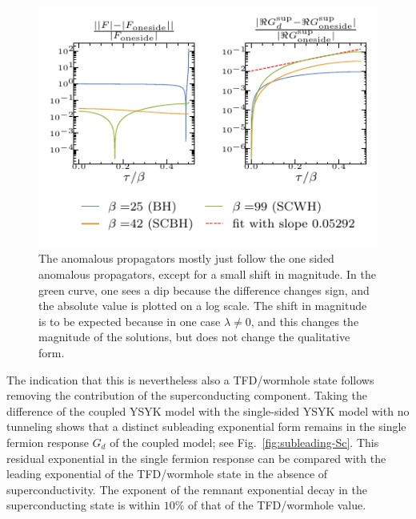 \begin{figure}
    \centering
    \includegraphics[width=0.5\linewidth]{figures/chapter3/ratioFsv2.pdf} %
    \caption{The anomalous propagators mostly just follow the one sided anomalous propagators, except for a small shift in magnitude. In the green curve, one sees a dip because the difference changes sign, and the absolute value is plotted on a log scale. The shift in magnitude is to be expected because in one case $\lambda \neq 0$, and this changes the magnitude of the solutions, but does not change the qualitative form.}
    \label{fig:Fratio}
\end{figure}
The indication that this is nevertheless also a TFD/wormhole state follows removing the contribution of the superconducting component. Taking the difference of the coupled YSYK model with the single-sided YSYK model with no tunneling shows that a distinct subleading exponential form remains in the single fermion response $G_d$ of the coupled model; see Fig.~\ref{fig:subleading-Sc}.
%
This residual exponential in the single fermion response can be compared with the leading exponential of the TFD/wormhole state in the absence of superconductivity. The exponent of the remnant exponential decay in the superconducting state is within $10\%$ of that of the TFD/wormhole value. 
